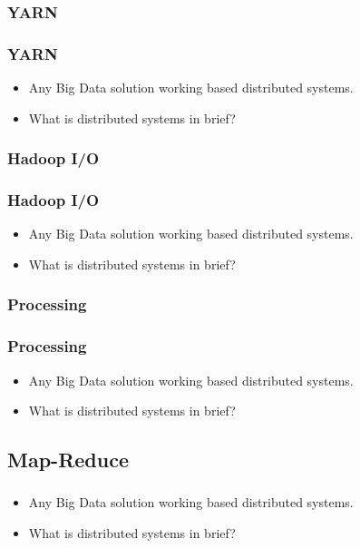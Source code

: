 
\subsubsection{YARN}
\begin{frame}
\frametitle{YARN}
\begin{itemize} 
	\item Any Big Data solution working based distributed systems.
	\item What is distributed systems in brief?
\end{itemize}
\end{frame}


\subsubsection{Hadoop I/O}
\begin{frame}
\frametitle{Hadoop I/O}
\begin{itemize} 
	\item Any Big Data solution working based distributed systems.
	\item What is distributed systems in brief?
\end{itemize}
\end{frame}


\subsubsection{Processing}
\begin{frame}
\frametitle{Processing}
\begin{itemize} 
	\item Any Big Data solution working based distributed systems.
	\item What is distributed systems in brief?
\end{itemize}
\end{frame}


\subsection{Map-Reduce}
\begin{frame}
\frametitle{\subsecname}
\begin{itemize} 
	\item Any Big Data solution working based distributed systems.
	\item What is distributed systems in brief?
\end{itemize}
\end{frame}

